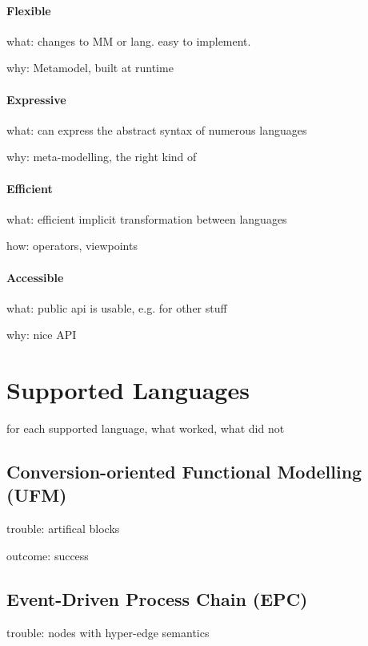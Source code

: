\paragraph{Flexible} 

what: changes to MM or lang. easy to implement. 

why: Metamodel, built at runtime

\paragraph{Expressive}

what: can express the abstract syntax of numerous languages

why: meta-modelling, the right kind of

\paragraph{Efficient}

what: efficient implicit transformation between languages

how: operators, viewpoints

\paragraph{Accessible}

what: public api is usable, e.g. for other stuff

why: nice API

\section{Supported Languages}
\label{sec:results:languages}

for each supported language, what worked, what did not

\subsection{Conversion-oriented Functional Modelling (UFM)}

trouble: artifical blocks

outcome: success

\subsection{Event-Driven Process Chain (EPC)}

trouble: nodes with hyper-edge semantics

